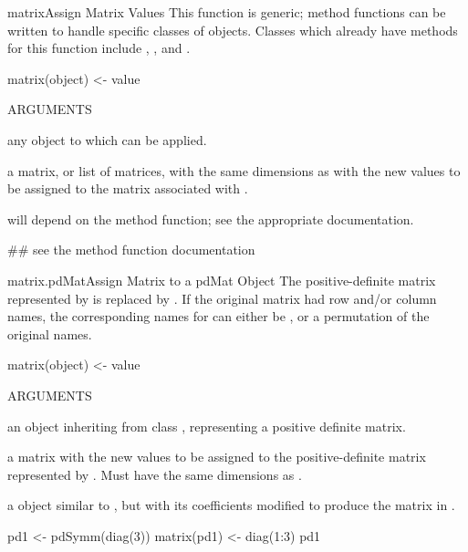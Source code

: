 \documentclass[pdftex]{article} \usepackage{url,graphicx}
\begin{document}
\begin{Helpfile}{matrix\Co{<-}}{Assign Matrix Values}
This function is generic; method functions can be written to handle
specific classes of objects. Classes which already have methods for
this function include , , and 
.
\begin{Example}
matrix(object) <- value
\end{Example}
\begin{Argument}{ARGUMENTS}
\item[\Co{object:}]
any object to which  can be applied.
\item[\Co{value:}]
a matrix, or list of matrices, with the same dimensions as
 with the new values to be assigned to the
matrix associated with .
\end{Argument}
will depend on the method function; see the appropriate documentation.
\need 15pt
\vspace{-16pt} 
\begin{Example}
## see the method function documentation
\end{Example}
\end{Helpfile}
\begin{Helpfile}{matrix\Co{<-}.pdMat}{Assign Matrix to a pdMat Object}
The positive-definite matrix represented by  is replaced
by . If the original matrix had row and/or column names,
the corresponding names for  can either be , or
a permutation of the original names.
\begin{Example}
matrix(object) <- value
\end{Example}
\begin{Argument}{ARGUMENTS}
\item[\Co{object:}]
an object inheriting from class , representing
a positive definite matrix.
\item[\Co{value:}]
a matrix with the new values to be assigned to the
positive-definite matrix represented by . Must have the
same dimensions as .
\end{Argument}
a  object similar to , but with its
coefficients modified to  produce the matrix in .
\need 15pt
\vspace{-16pt} 
\begin{Example}
pd1 <- pdSymm(diag(3))
matrix(pd1) <- diag(1:3)
pd1
\end{Example}
\end{Helpfile}
\end{document}
